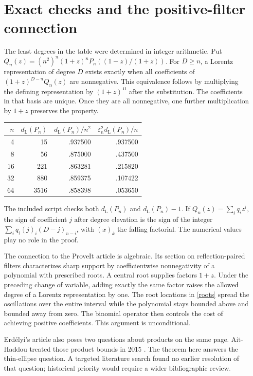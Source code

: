 \documentclass[11pt]{article}
\newcommand{\dd}{d_{\mathrm L}}
\begin{document}
\section{Exact checks and the positive-filter connection}
The least degrees in the table were determined in integer arithmetic. Put
$Q_n(z)=(n^2)^n(1+z)^nP_n((1-z)/(1+z))$. For $D\ge n$, a Lorentz representation of degree $D$ exists exactly when all coefficients of $(1+z)^{D-n}Q_n(z)$ are nonnegative. This equivalence follows by multiplying the defining representation by $(1+z)^D$ after the substitution. The coefficients in that basis are unique. Once they are all nonnegative, one further multiplication by $1+z$ preserves the property.
\begin{center}
\begin{tabular}{rrrr}
\toprule $n$ & $\dd(P_n)$ & $\dd(P_n)/n^2$ & $\varepsilon_n^2\dd(P_n)/n$\\\midrule
4 & 15 & .937500 & .937500\\
8 & 56 & .875000 & .437500\\
16 & 221 & .863281 & .215820\\
32 & 880 & .859375 & .107422\\
64 & 3516 & .858398 & .053650\\\bottomrule
\end{tabular}
\end{center}
The included script checks both $\dd(P_n)$ and $\dd(P_n)-1$. If $Q_n(z)=\sum_i q_i z^i$, the sign of coefficient $j$ after degree elevation is the sign of the integer
$\sum_i q_i(j)_i(D-j)_{n-i}$, with $(x)_k$ the falling factorial. The numerical values play no role in the proof.

The connection to the ProveIt article is algebraic. Its section on reflection-paired filters \cite{repo} characterizes sharp support by coefficientwise nonnegativity of a polynomial with prescribed roots. A central root supplies factors $1+z$. Under the preceding change of variable, adding exactly the same factor raises the allowed degree of a Lorentz representation by one. The root locations in \eqref{roots} spread the oscillations over the entire interval while the polynomial stays bounded above and bounded away from zero. The binomial operator then controls the cost of achieving positive coefficients. This argument is unconditional.

Erd\'elyi's article also poses two questions about products on the same page. Ait-Haddou treated those product bounds in 2015 \cite{ait}. The theorem here answers the thin-ellipse question. A targeted literature search found no earlier resolution of that question; historical priority would require a wider bibliographic review.
\end{document}
